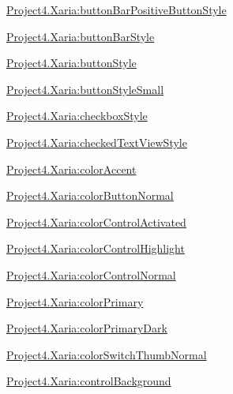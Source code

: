 {\ttfamily \hyperlink{classproject4_1_1xaria_1_1R_1_1styleable_a47fda447e64af3bb3b8673d0c9ad9c53}{Project4.\+Xaria\+:button\+Bar\+Positive\+Button\+Style}}

{\ttfamily \hyperlink{classproject4_1_1xaria_1_1R_1_1styleable_ac078eb7b75a54238baace3e740637b7f}{Project4.\+Xaria\+:button\+Bar\+Style}}

{\ttfamily \hyperlink{classproject4_1_1xaria_1_1R_1_1styleable_a3fab352cdcd70d5bb2081408ab0206af}{Project4.\+Xaria\+:button\+Style}}

{\ttfamily \hyperlink{classproject4_1_1xaria_1_1R_1_1styleable_ab6a564eb1b7f2c965484ca489fb8e95c}{Project4.\+Xaria\+:button\+Style\+Small}}

{\ttfamily \hyperlink{classproject4_1_1xaria_1_1R_1_1styleable_afad6cf2b0ee135e8a4df052b6eb4d916}{Project4.\+Xaria\+:checkbox\+Style}}

{\ttfamily \hyperlink{classproject4_1_1xaria_1_1R_1_1styleable_a22209fcca0bd05c9f68f33c77180738e}{Project4.\+Xaria\+:checked\+Text\+View\+Style}}

{\ttfamily \hyperlink{classproject4_1_1xaria_1_1R_1_1styleable_a6e46aba539289d70ed3d16e8e7bcb018}{Project4.\+Xaria\+:color\+Accent}}

{\ttfamily \hyperlink{classproject4_1_1xaria_1_1R_1_1styleable_a84437157df751a100d61fc0f2d910f0b}{Project4.\+Xaria\+:color\+Button\+Normal}}

{\ttfamily \hyperlink{classproject4_1_1xaria_1_1R_1_1styleable_ade53ff10ccbf446032b640b82cfcd1d8}{Project4.\+Xaria\+:color\+Control\+Activated}}

{\ttfamily \hyperlink{classproject4_1_1xaria_1_1R_1_1styleable_a9951a735820466ee03e784ca50e2c4f4}{Project4.\+Xaria\+:color\+Control\+Highlight}}

{\ttfamily \hyperlink{classproject4_1_1xaria_1_1R_1_1styleable_ab2853953a006b42c5c1b2506859cd11f}{Project4.\+Xaria\+:color\+Control\+Normal}}

{\ttfamily \hyperlink{classproject4_1_1xaria_1_1R_1_1styleable_a7389b87a9f3b557790bc968515833ae4}{Project4.\+Xaria\+:color\+Primary}}

{\ttfamily \hyperlink{classproject4_1_1xaria_1_1R_1_1styleable_ae0e5b2077cb1158569a4fbda2aa8dd71}{Project4.\+Xaria\+:color\+Primary\+Dark}}

{\ttfamily \hyperlink{classproject4_1_1xaria_1_1R_1_1styleable_acfe6607b27354b339604b23a504dfad6}{Project4.\+Xaria\+:color\+Switch\+Thumb\+Normal}}

{\ttfamily \hyperlink{classproject4_1_1xaria_1_1R_1_1styleable_a476553481ffe8e73dfc05dfcd351d945}{Project4.\+Xaria\+:control\+Background}}

